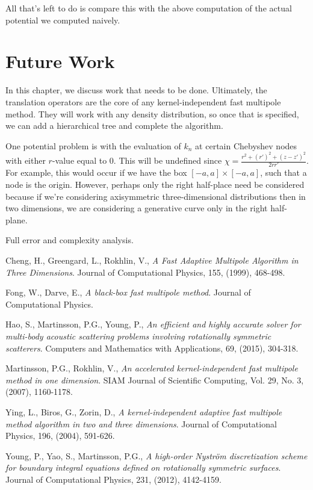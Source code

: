 \documentclass[11pt, oneside]{article}   	%
\begin{document}
All that's left to do is compare this with the above computation of the actual potential we computed naively.


\section{Future Work}
In this chapter, we discuss work that needs to be done. Ultimately, the translation operators are the core of any kernel-independent fast multipole method. They will work with any density distribution, so once that is specified, we can add a hierarchical tree and complete the algorithm.

One potential problem is with the evaluation of $k_n$ at certain Chebyshev nodes with either $r$-value equal to $0$. This will be undefined since $\chi = \frac{r^2+(r')^2+(z-z')^2}{2rr'}$. For example, this would occur if we have the box $[-a,a]\times[-a,a]$, such that a node is the origin. However, perhaps only the right half-place need be considered because if we're considering axisymmetric three-dimensional distributions then in two dimensions, we are considering a generative curve only in the right half-plane.

Full error and complexity analysis.

\begin{thebibliography}{99}

 Cheng, H., Greengard, L., Rokhlin, V., \emph{A Fast Adaptive Multipole Algorithm in Three Dimensions}. Journal of Computational Physics, 155, (1999), 468-498.

 Fong, W., Darve, E., \emph{A black-box fast multipole method}. Journal of Computational Physics.

 Hao, S., Martinsson, P.G., Young, P., \emph{An efficient and highly accurate solver for multi-body acoustic scattering problems involving rotationally symmetric scatterers}. Computers and Mathematics with Applications, 69, (2015), 304-318.

 Martinsson, P.G., Rokhlin, V., \emph{An accelerated kernel-independent fast multipole method in one dimension}. SIAM Journal of Scientific Computing, Vol. 29, No. 3, (2007), 1160-1178.

 Ying, L., Biros, G., Zorin, D., \emph{A kernel-independent adaptive fast multipole method algorithm in two and three dimensions}. Journal of Computational Physics, 196, (2004), 591-626.

 Young, P., Yao, S., Martinsson, P.G., \emph{A high-order Nystr{\"o}m discretization scheme for boundary integral equations defined on rotationally symmetric surfaces}. Journal of Computational Physics, 231, (2012), 4142-4159.

\end{thebibliography}
\end{document}
